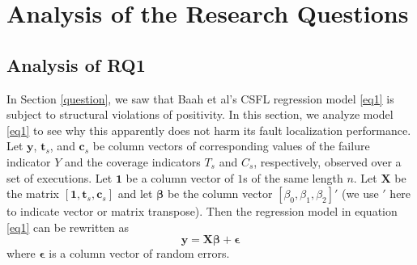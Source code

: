 \section{Analysis of the Research Questions}\label{sec3}
\subsection{Analysis of RQ1}\label{sec3.1}

In Section \ref{question}, we saw that Baah et al’s CSFL regression model \eqref{eq1} is subject to structural violations of positivity.  In this section, we analyze model \eqref{eq1} to see why this apparently does not harm its fault localization performance.  Let $\mathbf{y}$, $\mathbf{t}_s$, and $\mathbf{c}_s$ be column vectors of corresponding values of the failure indicator $Y$ and the coverage indicators $T_s$ and $C_s$, respectively, observed over a set of executions.  Let $\mathbf{1}$ be a column vector of $1$s of the same length $n$.  Let $\mathbf{X}$ be the matrix $[\mathbf{1}, \mathbf{t}_s, \mathbf{c}_s]$ and let $\mathbf{\beta}$ be the column vector $[\beta_0, \beta_1, \beta_2]'$ (we use $'$ here to indicate vector or matrix transpose). Then the regression model in equation \eqref{eq1} can be rewritten as
\begin{equation}\label{eq2}
\mathbf{y}=\mathbf{X} \bm{\beta}+\bm{\epsilon}
\end{equation}
where $\bm{\epsilon}$ is a column vector of random errors.

